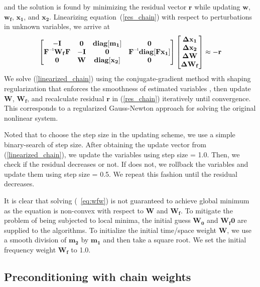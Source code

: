 and the solution is found by minimizing the residual vector $\mathbf{r}$ while updating $\mathbf{w}$, $\mathbf{w_f}$, $\mathbf{x_1}$, and $\mathbf{x_2}$. Linearizing equation~(\ref{res_chain}) with respect to perturbations in unknown variables, we arrive at
\begin{equation}
\begin{bmatrix}
\mathbf{-I} & \mathbf{0} & \mathbf{diag[m_1]} & \mathbf{0}\\
\mathbf{\inv{F}W_{f}F} & \mathbf{-I} & \mathbf{0} & \mathbf{\inv{F}diag[Fx_1]}\\
\mathbf{0} & \mathbf{W} & \mathbf{diag[x_2]}  & \mathbf{0}
\end{bmatrix}
\begin{bmatrix}
\mathbf{\Delta x_1} \\
\mathbf{\Delta x_2} \\
\mathbf{\Delta W} \\
\mathbf{\Delta W_f}
\end{bmatrix}
\approx \mathbf{-r} 
\label{linearized_chain}
\end{equation}
We solve (\ref{linearized_chain}) using the conjugate-gradient method with shaping regularization that enforces the smoothness of estimated variables \cite[]{shaping}, then update $\mathbf{W}$, $\mathbf{W_f}$, and recalculate residual $\mathbf{r}$ in (\ref{res_chain}) iteratively until  convergence. This corresponds to a regularized Gauss-Newton approach for solving the original nonlinear system. 

Noted that to choose the step size in the updating scheme, we use a simple binary-search of step size. After obtaining the update vector from (\ref{linearized_chain}), we update the variables using step size = 1.0. Then, we check if the residual decreases or not. If does not, we rollback the variables and update them using step size = 0.5. We repeat this fashion until the residual decreases.


It is clear that solving (~\ref{eq:wfw}) is not guaranteed to achieve global minimum as the equation is non-convex with respect to $\mathbf{W}$ and $\mathbf{W_f}$. To mitigate the problem of being subjected to local minima, the initial guess $\mathbf{W_0}$ and $\mathbf{W_f0}$ are supplied to the algorithms. To initialize the initial time/space weight $\mathbf{W}$, we use a smooth division of $\mathbf{m_2}$ by $\mathbf{m_1}$ \cite[]{local} and then take a square root. We set the initial frequency weight $\mathbf{W_f}$ to 1.0.


\subsection*{Preconditioning with chain weights}

